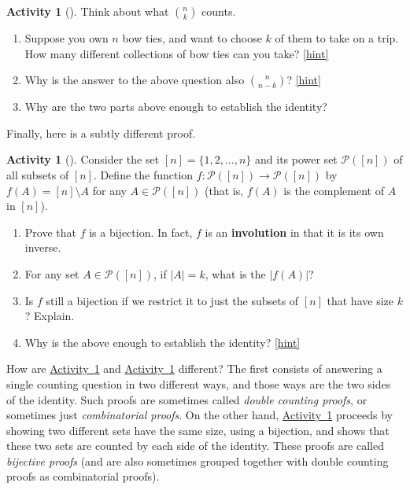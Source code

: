 \documentclass[10pt,]{book}
\newcommand{\terminology}[1]{\textbf{#1}}
\theoremstyle{plain}
\theoremstyle{definition}
\theoremstyle{definition}
\theoremstyle{definition}
\newtheorem{activity}[project]{Activity}
\numberwithin{equation}{chapter}
\def\pow{\mathcal P}
\newcommand{\card}[1]{\left| #1 \right|}
\begin{document}
\begin{activity}[]\label{act-pascalsym-dc}
\hypertarget{p-557}{}%
Think about what \(\binom{n}{k}\) counts.%
\begin{enumerate}[font=\bfseries,label=(\alph*),ref=\alph*]
\item\label{task-102} \hypertarget{p-558}{}%
Suppose you own \(n\) bow ties, and want to choose \(k\) of them to take on a trip.  How many different collections of bow ties can you take?%
\hfill{\tiny\hyperlink{a-74.a}{[hint]}\hypertarget{q-74.a}{}}\item\label{task-103} \hypertarget{p-560}{}%
Why is the answer to the above question also \(\binom{n}{n-k}\)?%
\hfill{\tiny\hyperlink{a-74.b}{[hint]}\hypertarget{q-74.b}{}}\item\label{task-104} \hypertarget{p-562}{}%
Why are the two parts above enough to establish the identity?%
\end{enumerate}
\end{activity}
\hypertarget{p-563}{}%
Finally, here is a subtly different proof.%
\begin{activity}[]\label{act-pascalsym-bij}
\hypertarget{p-564}{}%
Consider the set \([n] = \{1,2,\ldots,n\}\) and its power set \(\pow([n])\) of all subsets of \([n]\).  Define the function \(f:\pow([n]) \to \pow([n])\) by \(f(A) = [n]\setminus A\) for any \(A \in \pow([n])\) (that is, \(f(A)\) is the complement of \(A\) in \([n]\)).%
\begin{enumerate}[font=\bfseries,label=(\alph*),ref=\alph*]
\item\label{task-105} \hypertarget{p-565}{}%
Prove that \(f\) is a bijection.  In fact, \(f\) is an \terminology{involution} in that it is its own inverse.%
\item\label{task-106} \hypertarget{p-566}{}%
For any set \(A \in \pow([n])\), if \(\card{A} = k\), what is the \(\card{f(A)}\)?%
\item\label{task-107} \hypertarget{p-567}{}%
Is \(f\) still a bijection if we restrict it to just the subsets of \([n]\) that have size \(k\)?  Explain.%
\item\label{task-108} \hypertarget{p-568}{}%
Why is the above enough to establish the identity?%
\hfill{\tiny\hyperlink{a-75.d}{[hint]}\hypertarget{q-75.d}{}}\end{enumerate}
\end{activity}
\hypertarget{p-570}{}%
How are \hyperref[act-pascalsym-dc]{Activity~\ref{act-pascalsym-dc}} and \hyperref[act-pascalsym-bij]{Activity~\ref{act-pascalsym-bij}} different?  The first consists of answering a single counting question in two different ways, and those ways are the two sides of the identity.  Such proofs are sometimes called \emph{double counting proofs}, or sometimes just \emph{combinatorial proofs}.  On the other hand, \hyperref[act-pascalsym-bij]{Activity~\ref{act-pascalsym-bij}} proceeds by showing two different sets have the same size, using a bijection, and shows that these two sets are counted by each side of the identity.  These proofs are called \emph{bijective proofs} (and are also sometimes grouped together with double counting proofs as combinatorial proofs).%
\end{document}
